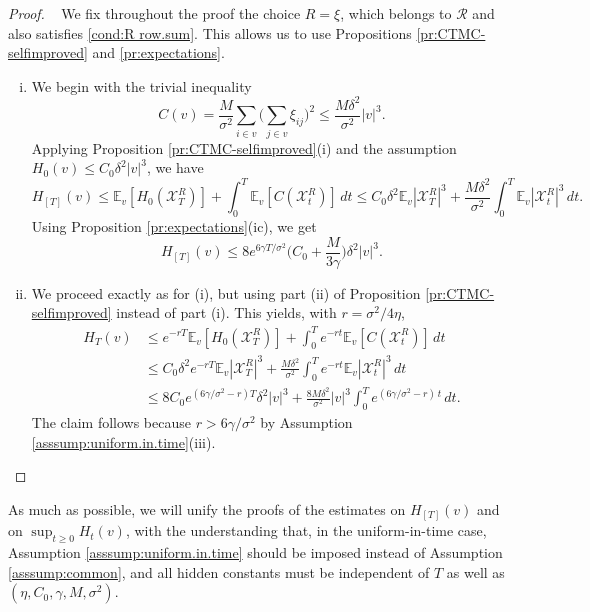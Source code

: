 \documentclass[11pt,reqno]{amsart}
\numberwithin{equation}{section}
\theoremstyle{definition}
\def\CC{{C}}
\def\E{{\mathbb E}}
\def\X{{\mathcal X}}
\begin{document}
\begin{proof} { \ }
	We fix throughout the proof the choice $R = \xi$, which belongs to  $ 	\mathcal{R}$ and also satisfies \eqref{cond:R row.sum}. This allows us to use Propositions \ref{pr:CTMC-selfimproved} and \ref{pr:expectations}. 
\begin{enumerate}[(i)]
\item 
We begin with the trivial inequality
\begin{equation*}
	\CC(v) = \frac{M}{\sigma^2} \sum_{i \in v} \bigg(\sum_{j \in v} \xi_{ij} \bigg)^2
	\le \frac{M\delta^2}{\sigma^2} |v|^3.
\end{equation*}
Applying Proposition \ref{pr:CTMC-selfimproved}(i) and the assumption $H_0(v) \le C_0\delta^2|v|^3$, we have 
\begin{equation*}
H_{[T]}(v) \le \E_v[H_0(\X_T^{R})] + \int_0^T \E_v[\CC(\X_t^{R})]\,dt  \le C_0\delta^2\E_v|\X_T^{R}|^3 + \frac{M\delta^2}{\sigma^2}\int_0^T \E_v|\X_t^{R}|^3\,dt .
\end{equation*}
Using Proposition \ref{pr:expectations}(ic), we get
\begin{equation*}
	H_{[T]}(v) \le 8e^{6\gamma T/\sigma^2}\Big(C_0+\frac{M}{3\gamma}\Big)\delta^2|v|^3.
\end{equation*} 
\item We proceed exactly as for (i), but using part (ii) of Proposition \ref{pr:CTMC-selfimproved} instead of part (i). This yields, with $r=\sigma^2/4\eta$, 
\begin{align*}
H_T(v) &\le e^{-rT}\E_v[H_0(\X_T^{R})] + \int_0^T e^{-rt}\E_v[\CC(\X_t^{R})]\,dt  \\
	&\le C_0\delta^2e^{-rT}\E_v|\X_T^{R}|^3 + \frac{M\delta^2}{\sigma^2}\int_0^T e^{-rt}\E_v|\X_t^{R}|^3\,dt \\
	&\le 8 C_0 e^{(6\gamma/\sigma^2 - r) T} \delta^2|v|^3 + \frac{ 8 M\delta^2}{\sigma^2} |v|^3 \int_0^T e^{(6\gamma/\sigma^2 - r)\,t} \,dt.
\end{align*}
The claim follows because $r > 6\gamma/\sigma^2$ by Assumption \ref{asssump:uniform.in.time}(iii). \qedhere
\end{enumerate} 
\end{proof}

As much as possible, we will unify the proofs of the estimates on $H_{[T]}(v)$ and on $\sup_{t \ge 0}H_t(v)$, with the understanding that, in the uniform-in-time case, Assumption \ref{asssump:uniform.in.time} should be imposed instead of Assumption \ref{asssump:common}, and all hidden constants must be independent of $T$ as well as $(\eta,C_0,\gamma, M,\sigma^2)$.
\end{document}
